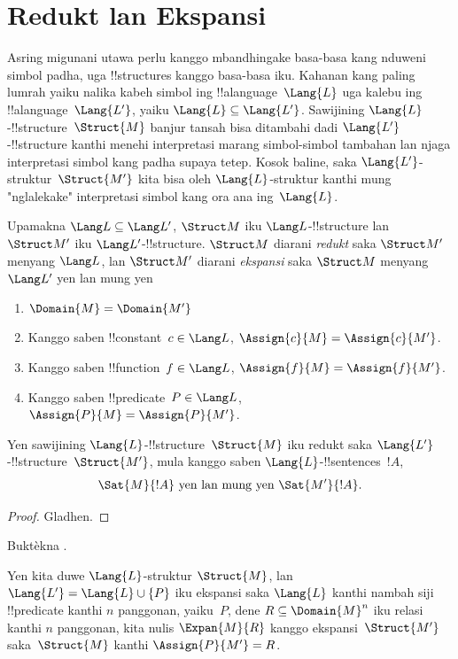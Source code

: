 \documentclass[../../../include/open-logic-section]{subfiles}
\begin{document}
\section{Redukt lan Ekspansi}

Asring migunani utawa perlu kanggo
mbandhingake basa-basa kang nduweni
simbol padha, uga !!{structure}s
kanggo basa-basa iku. Kahanan
kang paling lumrah yaiku nalika
kabeh simbol ing !!a{language}~$\Lang{L}$
uga kalebu ing !!a{language}~$\Lang{L'}$,
yaiku $\Lang{L} \subseteq
\Lang{L'}$. Sawijining
$\Lang{L}$-!!{structure}~$\Struct{M}$
banjur tansah bisa ditambahi dadi
$\Lang{L'}$-!!{structure}
kanthi menehi interpretasi
marang simbol-simbol tambahan
lan njaga interpretasi simbol
kang padha supaya tetep.
Kosok baline, saka
$\Lang{L'}$-struktur~$\Struct{M'}$
kita bisa oleh
$\Lang{L}$-struktur
kanthi mung "nglalekake"
interpretasi simbol kang
ora ana ing~$\Lang{L}$.

\begin{defn}
Upamakna $\Lang L \subseteq \Lang L'$,
$\Struct M$ iku
$\Lang L$-!!{structure} lan
$\Struct M'$ iku
$\Lang L'$-!!{structure}.
$\Struct M$ diarani \emph{redukt}
saka $\Struct M'$ menyang $\Lang L$,
lan $\Struct M'$ diarani
\emph{ekspansi} saka $\Struct M$
menyang $\Lang L'$ yen lan mung yen
\begin{enumerate}
\item $\Domain{M} = \Domain{M'}$
\item Kanggo saben !!{constant}~$c \in \Lang L$,
  $\Assign{c}{M} =
  \Assign{c}{M'}$.
\item Kanggo saben !!{function}~$f \in \Lang L$,
  $\Assign{f}{M} =
  \Assign{f}{M'}$.
\item Kanggo saben !!{predicate}~$P \in \Lang L$,
  $\Assign{P}{M} =
  \Assign{P}{M'}$.
\end{enumerate}
\end{defn}

\begin{prop}
Yen sawijining
$\Lang{L}$-!!{structure}~$\Struct{M}$
iku redukt saka
$\Lang{L'}$-!!{structure}~$\Struct{M'}$,
mula kanggo saben
$\Lang{L}$-!!{sentence}s~$!A$,
\[
\Sat{M}{!A} \text{ yen lan mung yen } \Sat{M'}{!A}.
\]
\end{prop}

\begin{proof}
  Gladhen.
\end{proof}

\begin{prob}
Buktèkna .
\end{prob}

\begin{defn}
Yen kita duwe
$\Lang{L}$-struktur $\Struct{M}$,
lan $\Lang{L'} =
\Lang{L} \cup \{P\}$ iku
ekspansi saka $\Lang{L}$
kanthi nambah siji
!!{predicate} kanthi $n$
panggonan, yaiku~$P$,
dene $R \subseteq \Domain{M}^n$
iku relasi kanthi $n$
panggonan, kita nulis
$\Expan{M}{R}$ kanggo
ekspansi~$\Struct{M'}$
saka~$\Struct{M}$
kanthi $\Assign{P}{M'} = R$.
\end{defn}
\end{document}
